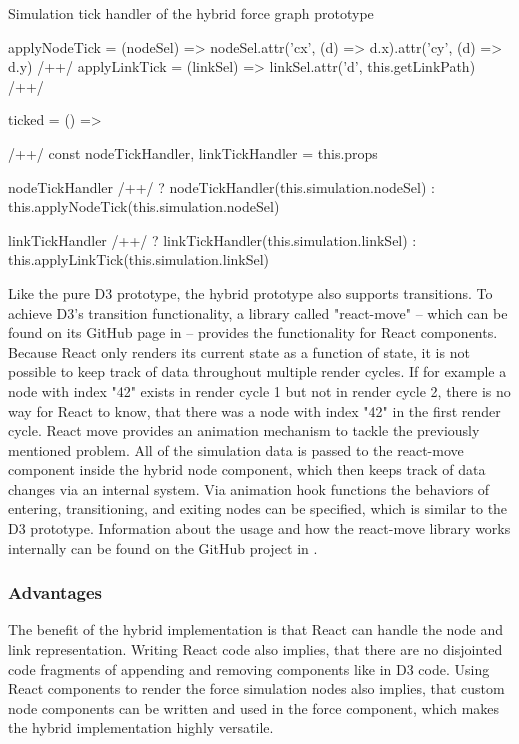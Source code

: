 \begin{program}
\caption{Simulation tick handler of the hybrid force graph prototype}
\label{prog:hybridTickHandler}
\begin{JsCode}
applyNodeTick = (nodeSel) => nodeSel.attr('cx', (d) => d.x).attr('cy', (d) => d.y) /+\label{line:applyNodeTick}+/
applyLinkTick = (linkSel) => linkSel.attr('d', this.getLinkPath) /+\label{line:applyLinkTick}+/

ticked = () => { /+\label{line:hybridTickHhandler}+/
  const { nodeTickHandler, linkTickHandler } = this.props

  nodeTickHandler /+\label{line:decideNodeTickHandler}+/
    ? nodeTickHandler(this.simulation.nodeSel)
    : this.applyNodeTick(this.simulation.nodeSel)

  linkTickHandler /+\label{line:decideLinkTickHandler}+/
    ? linkTickHandler(this.simulation.linkSel)
    : this.applyLinkTick(this.simulation.linkSel)
}
\end{JsCode}
\end{program}

Like the pure D3 prototype, the hybrid prototype also supports transitions. To achieve D3's transition functionality, a library called "react-move" -- which can be found on its GitHub page in \cite{ReactMove} -- provides the functionality for React components. Because React only renders its current state as a function of state, it is not possible to keep track of data throughout multiple render cycles. If for example a node with index "42" exists in render cycle 1 but not in render cycle 2, there is no way for React to know, that there was a node with index "42" in the first render cycle. React move provides an animation mechanism to tackle the previously mentioned problem. All of the simulation data is passed to the react-move component inside the hybrid node component, which then keeps track of data changes via an internal system. Via animation hook functions the behaviors of entering, transitioning, and exiting nodes can be specified, which is similar to the D3 prototype. Information about the usage and how the react-move library works internally can be found on the GitHub project in \cite{ReactMove}.


\subsubsection{Advantages}

The benefit of the hybrid implementation is that React can handle the node and link representation. Writing React code also implies, that there are no disjointed code fragments of appending and removing components like in D3 code. Using React components to render the force simulation nodes also implies, that custom node components can be written and used in the force component, which makes the hybrid implementation highly versatile.

